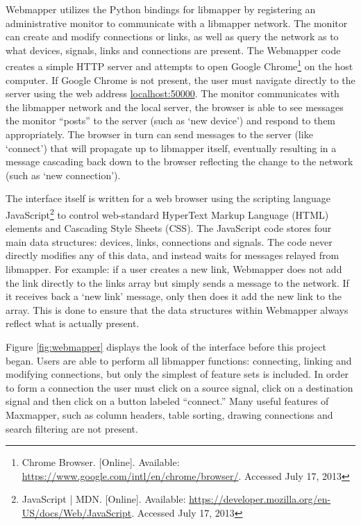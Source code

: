 Webmapper utilizes the Python bindings for libmapper by registering an administrative monitor to communicate with a libmapper network. The monitor can create and modify connections or links, as well as query the network as to what devices, signals, links and connections are present. The Webmapper code creates a simple HTTP server and attempts to open Google Chrome\footnote{Chrome Browser. [Online]. Available: \url{https://www.google.com/intl/en/chrome/browser/}. Accessed July 17, 2013} on the host computer. If Google Chrome is not present, the user must navigate directly to the server using the web address \url{localhost:50000}. The monitor communicates with the libmapper network and the local server, the browser is able to see messages the monitor ``posts'' to the server (such as `new device') and respond to them appropriately. The browser in turn can send messages to the server (like `connect') that will propagate up to libmapper itself, eventually resulting in a message cascading back down to the browser reflecting the change to the network (such as `new connection'). 

The interface itself is written for a web browser using the scripting language JavaScript\footnote{JavaScript | MDN. [Online]. Available: \url{https://developer.mozilla.org/en-US/docs/Web/JavaScript}. Accessed July 17, 2013} to control web-standard HyperText Markup Language (HTML) elements and Cascading Style Sheets (CSS). The JavaScript code stores four main data structures: devices, links, connections and signals. The code never directly modifies any of this data, and instead waits for messages relayed from libmapper. For example: if a user creates a new link, Webmapper does not add the link directly to the links array but simply sends a message to the network. If it receives back a `new link' message, only then does it add the new link to the array. This is done to ensure that the data structures within Webmapper always reflect what is actually present.

Figure \ref{fig:webmapper} displays the look of the interface before this project began. Users are able to perform all libmapper functions: connecting, linking and modifying connections, but only the simplest of feature sets is included. In order to form a connection the user must click on a source signal, click on a destination signal and then click on a button labeled ``connect.'' Many useful features of Maxmapper, such as column headers, table sorting, drawing connections and search filtering are not present.


